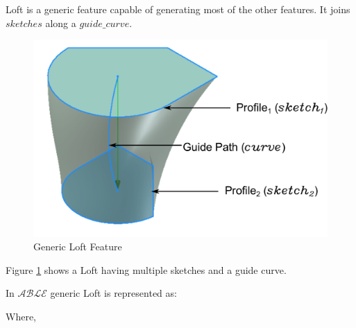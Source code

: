 
Loft is a generic feature capable of generating most of the other features. It joins $sketches$ along a $guide\_curve$.  

\begin{figure}[htbp]
\centering
	\includegraphics[scale=0.5]{images//LoftPreview.pdf} 
\caption{Generic Loft Feature}
\label{fig:abstraction:loftschematics}
\end{figure}



Figure \ref{fig:abstraction:loftschematics} shows a Loft having multiple sketches and a guide curve. 






In $\mathcal{ABLE}$ generic Loft is represented as:
\vskip 2mm
\vskip 2mm

Where,

